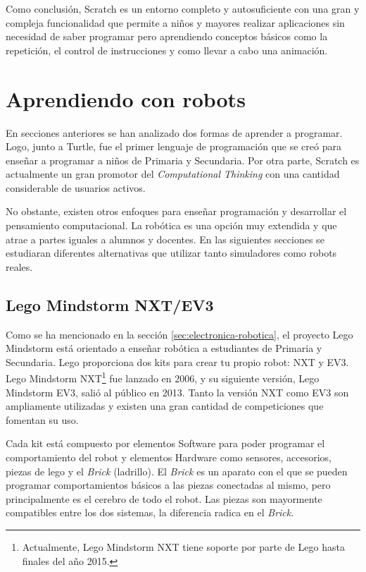 Como conclusión, Scratch es un entorno completo y autosuficiente con una gran y compleja funcionalidad que permite a niños y mayores realizar aplicaciones sin necesidad de saber programar pero aprendiendo conceptos básicos como la repetición, el control de instrucciones y como llevar a cabo una animación. 



\section{Aprendiendo con robots}
\label{sec:aprendiendo-robots}


En secciones anteriores se han analizado dos formas de aprender a programar. Logo, junto a Turtle, fue el primer lenguaje de programación que se creó para enseñar a programar a niños de Primaria y Secundaria. Por otra parte, Scratch es actualmente un gran promotor del \emph{Computational Thinking} con una cantidad considerable de usuarios activos.

No obstante, existen otros enfoques para enseñar programación y desarrollar el pensamiento computacional. La robótica es una opción muy extendida y que atrae a partes iguales a alumnos y docentes. En las siguientes secciones se estudiaran diferentes alternativas que utilizar tanto simuladores como robots reales.


\subsection{Lego Mindstorm NXT/EV3}
\label{sec:lego-nxt-ec3}

Como se ha mencionado en la sección \ref{sec:electronica-robotica}, el proyecto Lego Mindstorm\cite{lego-mindstorm} está orientado a enseñar robótica a estudiantes de Primaria y Secundaria. Lego proporciona dos kits para crear tu propio robot: NXT y EV3. Lego Mindstorm NXT\footnote{Actualmente, Lego Mindstorm NXT tiene soporte por parte de Lego hasta finales del año 2015.} fue lanzado en 2006, y su siguiente versión, Lego Mindstorm EV3, salió al público en 2013. Tanto la versión NXT como EV3 son ampliamente utilizadas y existen una gran cantidad de competiciones que fomentan su uso.

Cada kit está compuesto por elementos Software para poder programar el comportamiento del robot y elementos Hardware como sensores, accesorios, piezas de lego y el \emph{Brick} (ladrillo). El \emph{Brick} es un aparato con el que se pueden programar comportamientos básicos a las piezas conectadas al mismo, pero principalmente es el cerebro de todo el robot. Las piezas son mayormente compatibles entre los dos sistemas, la diferencia radica en el \emph{Brick}. 


